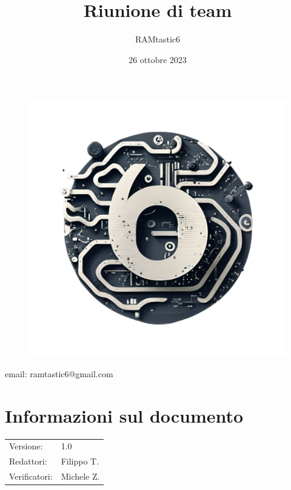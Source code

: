 \documentclass[12pt, oneside]{article}
\author{RAMtastic6}
\begin{document}
\thispagestyle{empty}
\title{Riunione di team}
\date{26 ottobre 2023} %

\maketitle
\begin{figure}[h]
	\centering
	\includegraphics[scale=0.3]{logo.png}
	\label{}
\end{figure}
\begin{center}
    email: ramtastic6@gmail.com
\end{center}

\section*{Informazioni sul documento}
\begin{tabular}{ll}
Versione: & 1.0 \\
Redattori: & Filippo T. \\
Verificatori: & Michele Z. \\ 
\end{tabular}
\newpage

\tableofcontents
\newpage

\end{document}
